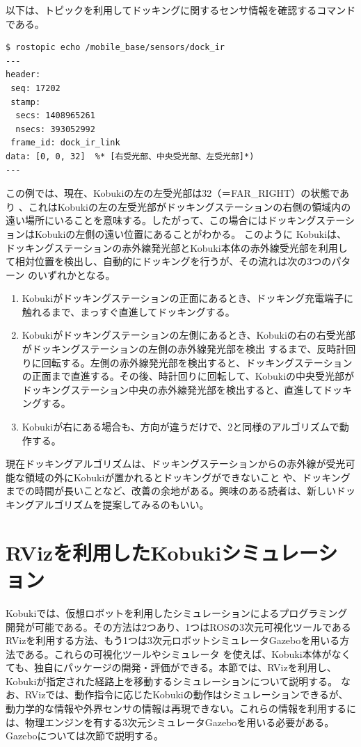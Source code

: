 \begin{itemize}
以下は、トピックを利用してドッキングに関するセンサ情報を確認するコマンドである。

\begin{lstlisting}[language=ROS]
$ rostopic echo /mobile_base/sensors/dock_ir
---
header:
 seq: 17202
 stamp:
  secs: 1408965261
  nsecs: 393052992
 frame_id: dock_ir_link
data: [0, 0, 32]  %* [右受光部、中央受光部、左受光部]*)
---
\end{lstlisting}

この例では、現在、Kobukiの左の左受光部は32（＝FAR\_RIGHT）の状態であり  、これはKobukiの左の左受光部がドッキングステーションの右側の領域内の遠い場所にいることを意味する。したがって、この場合にはドッキングステーションはKobukiの左側の遠い位置にあることがわかる。
このように  Kobukiは、ドッキングステーションの赤外線発光部とKobuki本体の赤外線受光部を利用して相対位置を検出し、自動的にドッキングを行うが、その流れは次の3つのパターン   のいずれかとなる。

\begin{enumerate}[leftmargin=*]
\item Kobukiがドッキングステーションの正面にあるとき、ドッキング充電端子に触れるまで、まっすぐ直進してドッキングする。

\item Kobukiがドッキングステーションの左側にあるとき、Kobukiの右の右受光部がドッキングステーションの左側の赤外線発光部を検出  するまで、反時計回りに回転する。左側の赤外線発光部を検出すると、ドッキングステーションの正面まで直進する。その後、時計回りに回転して、Kobukiの中央受光部がドッキングステーション中央の赤外線発光部を検出すると、直進してドッキングする。

\item Kobukiが右にある場合も、方向が違うだけで、2と同様のアルゴリズムで動作する。
\end{enumerate}

現在ドッキングアルゴリズムは、ドッキングステーションからの赤外線が受光可能な領域の外にKobukiが置かれるとドッキングができないこと   や、ドッキングまでの時間が長いことなど、改善の余地がある。興味のある読者は、新しいドッキングアルゴリズムを提案してみるのもいい。

\section{RVizを利用したKobukiシミュレーション}

Kobukiでは、仮想ロボットを利用したシミュレーションによるプログラミング開発が可能である。その方法は2つあり、1つはROSの3次元可視化ツールであるRVizを利用する方法、もう1つは3次元ロボットシミュレータGazeboを用いる方法である。これらの可視化ツールやシミュレータ  を使えば、Kobuki本体がなくても、独自にパッケージの開発・評価ができる。本節では、RVizを利用し、Kobukiが指定された経路上を移動するシミュレーションについて説明する。
なお、RVizでは、動作指令に応じたKobukiの動作はシミュレーションできるが、動力学的な情報や外界センサの情報は再現できない。これらの情報を利用するには、物理エンジンを有する3次元シミュレータGazeboを用いる必要がある。Gazeboについては次節で説明する。


\end{itemize}
